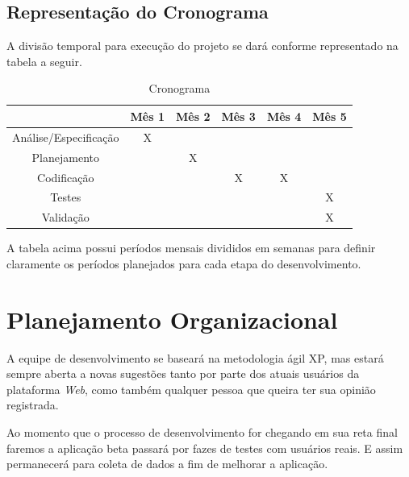 \documentclass[
	article,			%
	11pt,				%
	oneside,			%
	a4paper,			%
	english,			%
	brazil,				%
	sumario=tradicional
	]{abntex2}
\begin{document}
\subsection{Representação do Cronograma}

A divisão temporal para execução do projeto se dará conforme representado na tabela a seguir.

\begin{table}
	\centering
	\caption{Cronograma}
	\label{my-label}
	\begin{tabular}{|c|c|c|c|c|c|}
		\hline
		& \textbf{Mês 1} & \textbf{Mês 2} & \textbf{Mês 3} & \textbf{Mês 4} & \textbf{Mês 5} \\ \hline
		Análise/Especificação & X              &                &                &                &                \\ \hline
		Planejamento          &                & X              &                &                &                \\ \hline
		Codificação           &                &                & X              & X              &                \\ \hline
		Testes                &                &                &                &                & X              \\ \hline
		Validação             &                &                &                &                & X              \\ \hline
	\end{tabular}
\end{table}

A tabela acima possui períodos mensais divididos em semanas para definir claramente os períodos planejados para cada etapa do desenvolvimento.

\section{Planejamento Organizacional}

A equipe de desenvolvimento se baseará na metodologia ágil XP, mas estará sempre aberta a novas sugestões tanto por parte dos atuais usuários da plataforma \textit{Web}, como também qualquer pessoa que queira ter sua opinião registrada.

Ao momento que o processo de desenvolvimento for chegando em sua reta final faremos a aplicação beta passará por fazes de testes com usuários reais. E assim permanecerá para coleta de dados a fim de melhorar a aplicação.
\end{document}
